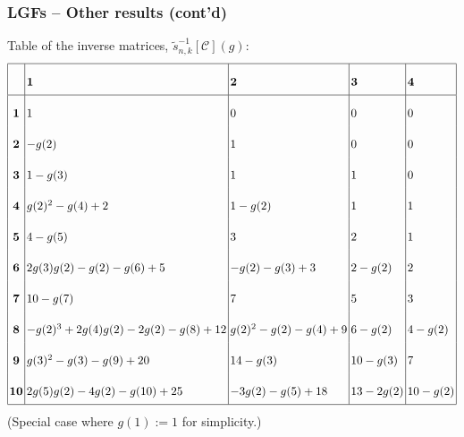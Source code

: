 \begin{frame}
\frametitle{LGFs -- Other results (cont'd)}

Table of the inverse matrices, $\widetilde{s}^{-1}_{n,k}[\mathcal{C}](g)$:
{\tiny
\begin{equation*}
\arraycolsep=1.6pt\def\arraystretch{2.2}
\begin{array}{|c|l|l|l|l|} \hline 
 & \mathbf{1} & \mathbf{2} & \mathbf{3} & \mathbf{4} \\ \hline 
\mathbf{1} & 1 & 0 & 0 & 0 \\
\mathbf{2} & -g(2) & 1 & 0 & 0 \\
\mathbf{3} & 1-g(3) & 1 & 1 & 0 \\
\mathbf{4} & g(2)^2-g(4)+2 & 1-g(2) & 1 & 1 \\
\mathbf{5} & 4-g(5) & 3 & 2 & 1 \\
\mathbf{6} & 2 g(3) g(2)-g(2)-g(6)+5 & -g(2)-g(3)+3 & 2-g(2) & 2 \\
\mathbf{7} & 10-g(7) & 7 & 5 & 3 \\
\mathbf{8} & -g(2)^3+2 g(4) g(2)-2 g(2)-g(8)+12 & g(2)^2-g(2)-g(4)+9 & 6-g(2) & 4-g(2) \\
\mathbf{9} & g(3)^2-g(3)-g(9)+20 & 14-g(3) & 10-g(3) & 7 \\
\mathbf{10} & 2 g(5) g(2)-4 g(2)-g(10)+25 & -3 g(2)-g(5)+18 & 13-2 g(2) & 10-g(2) \\ \hline 
\end{array}
\end{equation*}
}
(Special case where $g(1) := 1$ for simplicity.)

\end{frame}

